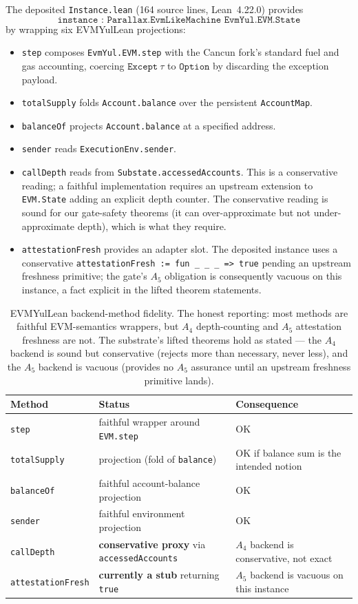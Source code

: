 \documentclass[11pt,a4paper]{article}
\begin{document}
The deposited \texttt{Instance.lean} (164 source lines, Lean~4.22.0) provides
\[
  \texttt{instance : Parallax.EvmLikeMachine EvmYul.EVM.State}
\]
by wrapping six EVMYulLean projections:

\begin{itemize}
\item \texttt{step} composes \texttt{EvmYul.EVM.step} with the Cancun fork's standard fuel and gas accounting, coercing $\texttt{Except}\ \tau$ to $\texttt{Option}$ by discarding the exception payload.
\item \texttt{totalSupply} folds \texttt{Account.balance} over the persistent \texttt{AccountMap}.
\item \texttt{balanceOf} projects \texttt{Account.balance} at a specified address.
\item \texttt{sender} reads \texttt{ExecutionEnv.sender}.
\item \texttt{callDepth} reads from \texttt{Substate.accessedAccounts}. This is a conservative reading; a faithful implementation requires an upstream extension to \texttt{EVM.State} adding an explicit depth counter. The conservative reading is sound for our gate-safety theorems (it can over-approximate but not under-approximate depth), which is what they require.
\item \texttt{attestationFresh} provides an adapter slot. The deposited instance uses a conservative \texttt{attestationFresh := fun \_ \_ \_ => true} pending an upstream freshness primitive; the gate's $A_5$ obligation is consequently vacuous on this instance, a fact explicit in the lifted theorem statements.
\end{itemize}

\begin{table}[h]
\centering
\small
\begin{tabular}{lll}
\toprule
Method & Status & Consequence \\
\midrule
\texttt{step} & faithful wrapper around \texttt{EVM.step} & OK \\
\texttt{totalSupply} & projection (fold of \texttt{balance}) & OK if balance sum is the intended notion \\
\texttt{balanceOf} & faithful account-balance projection & OK \\
\texttt{sender} & faithful environment projection & OK \\
\texttt{callDepth} & \textbf{conservative proxy} via \texttt{accessedAccounts} & $A_4$ backend is conservative, not exact \\
\texttt{attestationFresh} & \textbf{currently a stub} returning \texttt{true} & $A_5$ backend is vacuous on this instance \\
\bottomrule
\end{tabular}
\caption{EVMYulLean backend-method fidelity. The honest reporting: most methods are faithful EVM-semantics wrappers, but $A_4$ depth-counting and $A_5$ attestation freshness are not. The substrate's lifted theorems hold as stated --- the $A_4$ backend is sound but conservative (rejects more than necessary, never less), and the $A_5$ backend is vacuous (provides no $A_5$ assurance until an upstream freshness primitive lands).}\label{tab:evmyul-fidelity}
\end{table}
\end{document}
